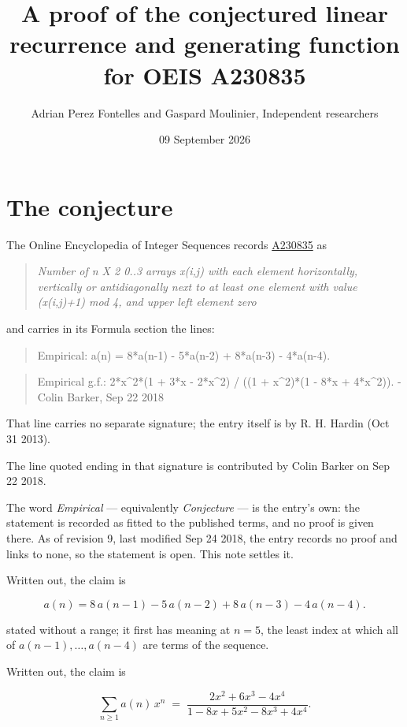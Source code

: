 \documentclass[11pt]{article}
\title{A proof of the conjectured linear recurrence and generating function for OEIS A230835}
\author{Adrian Perez Fontelles and Gaspard Moulinier, Independent researchers}
\date{09 September 2026}
\theoremstyle{definition}
\begin{document}
\maketitle
\section{The conjecture}

The Online Encyclopedia of Integer Sequences records \href{https://oeis.org/A230835}{A230835} as

\begin{quote}\itshape Number of n X 2 0..3 arrays x(i,j) with each element horizontally, vertically or antidiagonally next to at least one element with value (x(i,j)+1) mod 4, and upper left element zero\end{quote}

and carries in its Formula section the lines:

\begin{quote}\ttfamily Empirical: a(n) = 8*a(n-1) - 5*a(n-2) + 8*a(n-3) - 4*a(n-4).\end{quote}

\begin{quote}\ttfamily Empirical g.f.: 2*x\textasciicircum{}2*(1 + 3*x - 2*x\textasciicircum{}2) / ((1 + x\textasciicircum{}2)*(1 - 8*x + 4*x\textasciicircum{}2)). - Colin Barker, Sep 22 2018\end{quote}

That line carries no separate signature; the entry itself is by R. H. Hardin (Oct 31 2013).

The line quoted ending in that signature is contributed by Colin Barker on Sep 22 2018.

The word {\itshape Empirical} --- equivalently {\itshape Conjecture} --- is the entry's own: the statement is recorded as fitted to the published terms, and no proof is given there. As of revision 9, last modified Sep 24 2018, the entry records no proof and links to none, so the statement is open. This note settles it.

Written out, the claim is

\[a(n) = 8\,a(n-1) - 5\,a(n-2) + 8\,a(n-3) - 4\,a(n-4).\]

stated without a range; it first has meaning at $n = 5$, the least index at which all of $a(n-1),\dots,a(n-4)$ are terms of the sequence.

Written out, the claim is

\[\sum_{n \ge 1} a(n)\,x^n \;=\; \frac{2x^{2} + 6x^{3} - 4x^{4}}{1 - 8x + 5x^{2} - 8x^{3} + 4x^{4}}.\]
\end{document}
